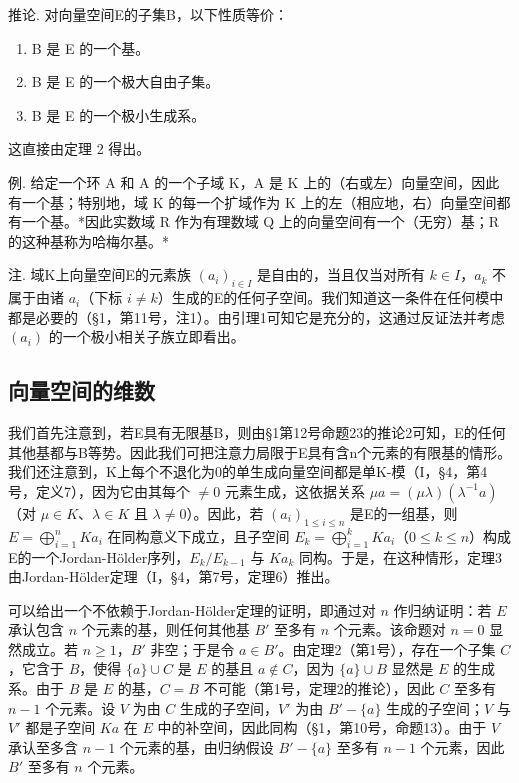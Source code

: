 推论. 对向量空间E的子集B，以下性质等价：

\begin{enumerate}
\def\labelenumi{(\alph{enumi})}
\item
  B 是 E 的一个基。
\item
  B 是 E 的一个极大自由子集。
\item
  B 是 E 的一个极小生成系。
\end{enumerate}

这直接由定理 2 得出。

例. 给定一个环 A 和 A 的一个子域 K，A 是 K 上的（右或左）向量空间，因此有一个基；特别地，域 K 的每一个扩域作为 K 上的左（相应地，右）向量空间都有一个基。*因此实数域 R 作为有理数域 Q 上的向量空间有一个（无穷）基；R 的这种基称为哈梅尔基。*

注. 域K上向量空间E的元素族 \((a_{i})_{i\in I}\) 是自由的，当且仅当对所有 \(k\in I\)，\(a_{k}\) 不属于由诸 \(a_{i}\)（下标 \(i\neq k\)）生成的E的任何子空间。我们知道这一条件在任何模中都是必要的（§1，第11号，注1）。由引理1可知它是充分的，这通过反证法并考虑 \((a_{i})\) 的一个极小相关子族立即看出。

\subsection{向量空间的维数}


我们首先注意到，若E具有无限基B，则由§1第12号命题23的推论2可知，E的任何其他基都与B等势。因此我们可把注意力局限于E具有含n个元素的有限基的情形。我们还注意到，K上每个不退化为0的单生成向量空间都是单K-模（I，§4，第4号，定义7），因为它由其每个 \(\neq0\) 元素生成，这依据关系 \(\mu a = (\mu \lambda)(\lambda^{-1}a)\)（对 \(\mu \in K\)、\(\lambda \in K\) 且 \(\lambda \neq 0\)）。因此，若 \((a_{i})_{1 \leqslant i \leqslant n}\) 是E的一组基，则 \(E = \bigoplus_{i=1}^{n} Ka_{i}\) 在同构意义下成立，且子空间 \(E_{k} = \bigoplus_{i=1}^{k} Ka_{i}\)（\(0 \leqslant k \leqslant n\)）构成E的一个Jordan-Hölder序列，\(E_{k}/E_{k-1}\) 与 \(Ka_{k}\) 同构。于是，在这种情形，定理3由Jordan-Hölder定理（I，§4，第7号，定理6）推出。

可以给出一个不依赖于Jordan-Hölder定理的证明，即通过对 \(n\) 作归纳证明：若 \(E\) 承认包含 \(n\) 个元素的基，则任何其他基 \(B'\) 至多有 \(n\) 个元素。该命题对 \(n = 0\) 显然成立。若 \(n \geqslant 1\)，\(B'\) 非空；于是令 \(a \in B'\)。由定理2（第1号），存在一个子集 \(C\)，它含于 \(B\)，使得 \(\{a\} \cup C\) 是 \(E\) 的基且 \(a \notin C\)，因为 \(\{a\} \cup B\) 显然是 \(E\) 的生成系。由于 \(B\) 是 \(E\) 的基，\(C = B\) 不可能（第1号，定理2的推论），因此 \(C\) 至多有 \(n - 1\) 个元素。设 \(V\) 为由 \(C\) 生成的子空间，\(V'\) 为由 \(B' - \{a\}\) 生成的子空间；\(V\) 与 \(V'\) 都是子空间 \(Ka\) 在 \(E\) 中的补空间，因此同构（§1，第10号，命题13）。由于 \(V\) 承认至多含 \(n - 1\) 个元素的基，由归纳假设 \(B' - \{a\}\) 至多有 \(n - 1\) 个元素，因此 \(B'\) 至多有 \(n\) 个元素。

